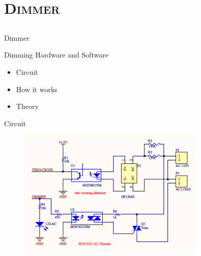 	
	\section{\scshape Dimmer}
	\subsection{}
   \begin{frame}
      \Huge{\centerline{Dimmer}}
   \end{frame}

	\begin{frame}{Dimming Hardware and Software}
		\begin{itemize}
			\item Circuit
			\item How it works
			\item Theory
		\end{itemize}
		
	\end{frame}
	
	\begin{frame}{Circuit}
		
		\begin{figure}[ht!]
			\centering
			\includegraphics[width=0.8\textwidth]{Circuit.png}
			\label{fig:circuit}
		\end{figure} 
		
	\end{frame}
	
